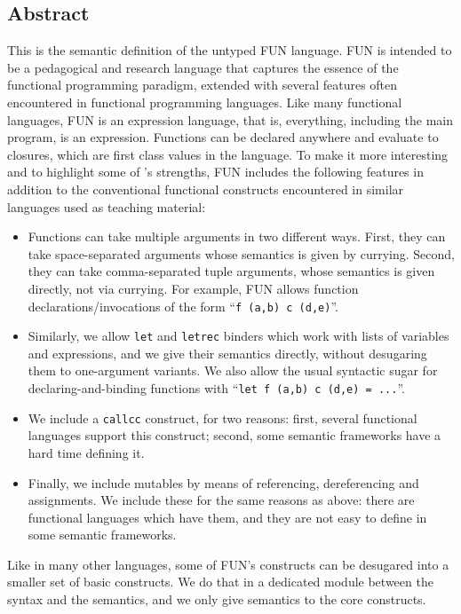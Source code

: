 \begin{latexComment}
\section{Abstract}
This is the \K semantic definition of the untyped FUN language.
FUN is intended to be a pedagogical and research language that captures
the essence of the functional programming paradigm, extended with several
features often encountered in functional programming languages.
Like many functional languages, FUN is an expression language,
that is, everything, including the main program, is an expression.
Functions can be declared anywhere and evaluate to closures, which
are first class values in the language.  To make it more
interesting and to highlight some of \K's strengths, FUN includes
the following features in addition to the conventional functional
constructs encountered in similar languages used as teaching material:
\begin{itemize}
\item Functions can take multiple arguments in two different ways.
First, they can take space-separated arguments whose semantics is given by
currying.  Second, they can take comma-separated tuple arguments, whose
semantics is given directly, not via currying.  For example, FUN allows
function declarations/invocations of the form
``\texttt{f (a,b) c  (d,e)}''.
\item Similarly, we allow \texttt{let} and \texttt{letrec} binders
which work with lists of variables and expressions, and we give
their semantics directly, without desugaring them to one-argument variants.
We also allow the usual syntactic sugar for declaring-and-binding functions
with ``\texttt{let f (a,b) c (d,e) = ...}''.
\item We include a \texttt{callcc} construct, for two reasons: first,
several functional languages support this construct; second, some
semantic frameworks have a hard time defining it.
\item Finally, we include mutables by means of referencing, dereferencing and
assignments.  We include these for the same reasons as above: there are
functional languages which have them, and they are not easy to define
in some semantic frameworks.
\end{itemize}
Like in many other languages, some of FUN's constructs can be
desugared into a smaller set of basic constructs.  We do that in a 
dedicated module between the syntax and the semantics, and we only
give semantics to the core constructs.


\end{latexComment}

